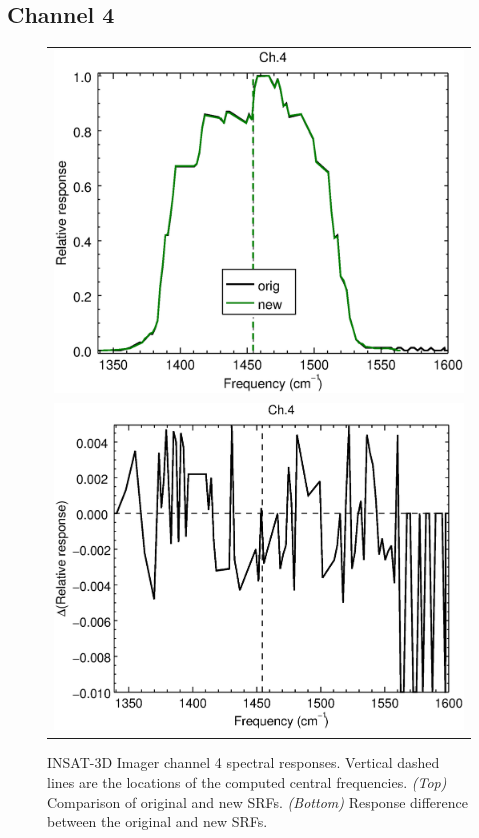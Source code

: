 \subsection{Channel 4}
\begin{figure}[H]
  \label{fig:imgr_ch4}
  \centering
  \begin{tabular}{c}
    \includegraphics[scale=0.55]{graphics/imgr/srf/imgr_insat3d-4.eps} \\
    \includegraphics[scale=0.55]{graphics/imgr/srf/imgr_insat3d-4.difference.eps}
  \end{tabular}
  \caption{INSAT-3D Imager channel 4 spectral responses. Vertical dashed lines are the locations of the computed central frequencies. \emph{(Top)} Comparison of original and new SRFs. \emph{(Bottom)} Response difference between the original and new SRFs.}
\end{figure}

